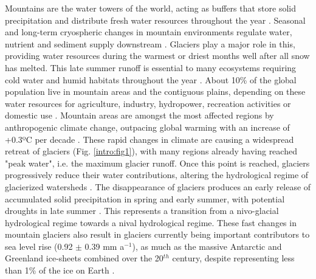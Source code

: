Mountains are the water towers of the world, acting as buffers that store solid precipitation and distribute fresh water resources throughout the year \citep{immerzeel_importance_2020}. Seasonal and long-term cryospheric changes in mountain environments regulate water, nutrient and sediment supply downstream \citep{huss_toward_2017}. Glaciers play a major role in this, providing water resources during the warmest or driest months well after all snow has melted. This late summer runoff is essential to many ecosystems requiring cold water and humid habitats throughout the year \citep{cauvy-fraunie_global_2019, carlson_monitoring_2020}. About 10\% of the global population live in mountain areas and the contiguous plains, depending on these water resources for agriculture, industry, hydropower, recreation activities or domestic use \citep{huss_global-scale_2018,farinotti_large_2019}. Mountain areas are amongst the most affected regions by anthropogenic climate change, outpacing global warming  with an increase of +0.3ºC per decade \citep{ipcc_climate_2018}. These rapid changes in climate are causing a widespread retreat of glaciers (Fig. \ref{intro:fig1}), with many regions already having reached "peak water", i.e. the maximum glacier runoff. Once this point is reached, glaciers progressively reduce their water contributions, altering the hydrological regime of glacierized watersheds \citep{huss_global-scale_2018}. The disappearance of glaciers produces an early release of accumulated solid precipitation in spring and early summer, with potential droughts in late summer \citep{brunner_future_2019}. This represents a transition from a nivo-glacial hydrological regime towards a nival hydrological regime. These fast changes in mountain glaciers also result in glaciers currently being important contributors to sea level rise (0.92 $\pm$ 0.39 mm a$^{-1}$), as much as the massive Antarctic and Greenland ice-sheets combined over the 20$^{th}$ century, despite representing less than 1\% of the ice on Earth \citep{zemp_global_2019, hock_glaciermip_2019}. 

